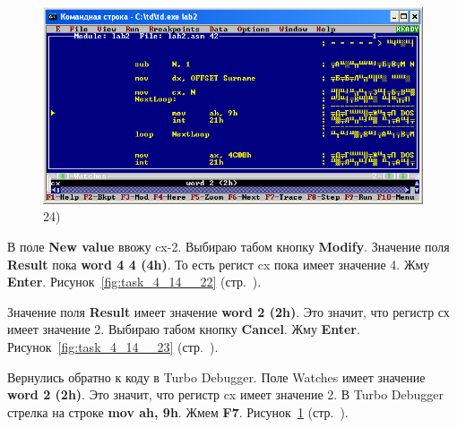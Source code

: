 \begin{figure}[!htp]
    \begin {minipage}{0.32\textwidth}
        \centering
        \includegraphics[width=.99\linewidth]
            {../_INCLUDES/task-4-14/24.png}
        \caption{24) }
        \label{fig:task_4_14__24}
    \end{minipage}
\end{figure}

В поле \textbf{New value} ввожу cx-2.
Выбираю табом кнопку \textbf{Modify}.
Значение поля \textbf{Result} пока \textbf{word 4 4 (4h)}.
То есть регист cx пока имеет значение 4.
Жму \textbf{Enter}.
Рисунок~\ref{fig:task_4_14__22} (стр.~\pageref{fig:task_4_14__22}).

Значение поля \textbf{Result} имеет значение \textbf{word 2 (2h)}.
Это значит, что регистр сх имеет значение 2.
Выбираю табом кнопку \textbf{Cancel}.
Жму \textbf{Enter}.
Рисунок~\ref{fig:task_4_14__23} (стр.~\pageref{fig:task_4_14__23}).

Вернулись обратно к коду в Turbo Debugger.
Поле Watches имеет значение \textbf{word 2 (2h)}.
Это значит, что регистр cx имеет значение 2.
В Turbo Debugger стрелка на строке \textbf{mov ah, 9h}.
Жмем \textbf{F7}.
Рисунок~\ref{fig:task_4_14__24} (стр.~\pageref{fig:task_4_14__24}).

